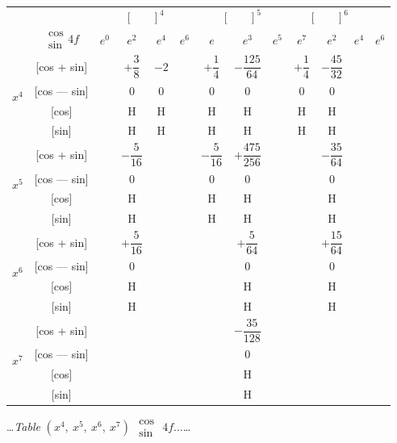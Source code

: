 \documentclass[10pt,a4paper]{article}
\newcommand{\tabletitle}[2]{%
  \begin{center}
  \ldots\textit{Table} #1 $\displaystyle\begin{smallmatrix} \cos \\ \sin \end{smallmatrix}$ #2\ldots
  \end{center}
}
\begin{document}
\begin{center}
\small
\begin{tabular}{|c|c|c|c|c|c|c|c|c|c|c|c|}
\hline
& &  &  &  \\
& $\begin{smallmatrix} \cos \\ \sin \end{smallmatrix} 4f$ & $e^0$ & $e^2$ & $e^4$ & $e^6$ & $e$ & $e^3$ & $e^5$ & $e^7$ & $e^2$ & $e^4$ & $e^6$ \\
\hline
{} & [cos + sin] & & $+\dfrac{3}{8}$ & $-2$ & & $+\dfrac{1}{4}$ & $-\dfrac{125}{64}$ & & $+\dfrac{1}{4}$ & $-\dfrac{45}{32}$ \\
& [cos --- sin] & & $0$ & $0$ & & $0$ & $0$ & & $0$ & $0$ \\
& [cos] & & H & H & & H & H & & H & H \\
& [sin] & & H & H & & H & H & & H & H \\
\hline
{} & [cos + sin] & & $-\dfrac{5}{16}$ & & & $-\dfrac{5}{16}$ & $+\dfrac{475}{256}$ & & & $-\dfrac{35}{64}$ \\
& [cos --- sin] & & $0$ & & & $0$ & $0$ & & & $0$ \\
& [cos] & & H & & & H & H & & & H \\
& [sin] & & H & & & H & H & & & H \\
\hline
{} & [cos + sin] & & $+\dfrac{5}{16}$ & & & & $+\dfrac{5}{64}$ & & & $+\dfrac{15}{64}$ \\
& [cos --- sin] & & $0$ & & & & $0$ & & & $0$ \\
& [cos] & & H & & & & H & & & H \\
& [sin] & & H & & & & H & & & H \\
\hline
{} & [cos + sin] & & & & & & $-\dfrac{35}{128}$ & & \\
& [cos --- sin] & & & & & & $0$ & & \\
& [cos] & & & & & & H & & \\
& [sin] & & & & & & H & & \\
\hline
\end{tabular}
\end{center}

\newpage
\tabletitle{$(x^4,\ x^5,\ x^6,\ x^7)$}{$4f\ldots$}
\end{document}
